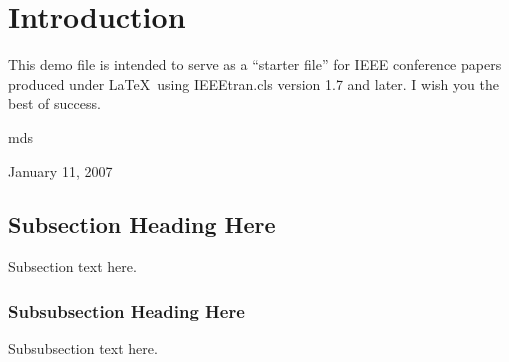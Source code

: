 \documentclass[conference]{IEEEtran}
\begin{document}




\maketitle


\begin{abstract}
The abstract goes here.
\end{abstract}





%
\IEEEpeerreviewmaketitle



\section{Introduction}
This demo file is intended to serve as a ``starter file''
for IEEE conference papers produced under \LaTeX\ using
IEEEtran.cls version 1.7 and later.
I wish you the best of success.

\hfill mds
 
\hfill January 11, 2007

\subsection{Subsection Heading Here}
Subsection text here.


\subsubsection{Subsubsection Heading Here}
Subsubsection text here.
\end{document}
